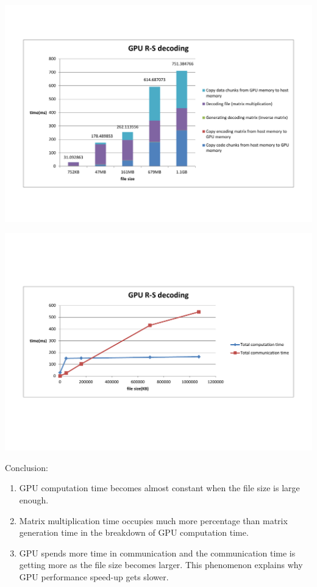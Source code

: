 \documentclass[a4paper]{article}
\begin{document}
\includegraphics[scale=0.48]{result-graph/GPU-decode-steps.pdf}

\includegraphics[scale=0.42]{result-graph/GPU-RS-decode.pdf}

Conclusion:
\begin{enumerate}
\item GPU computation time becomes almost constant when the file size is large enough.
\item Matrix multiplication time occupies much more percentage than matrix generation time in the breakdown of GPU computation time.
\item GPU spends more time in communication and the communication time is getting more as the file size becomes larger. This phenomenon explains why GPU performance speed-up gets slower.
\end{enumerate}
\end{document}
